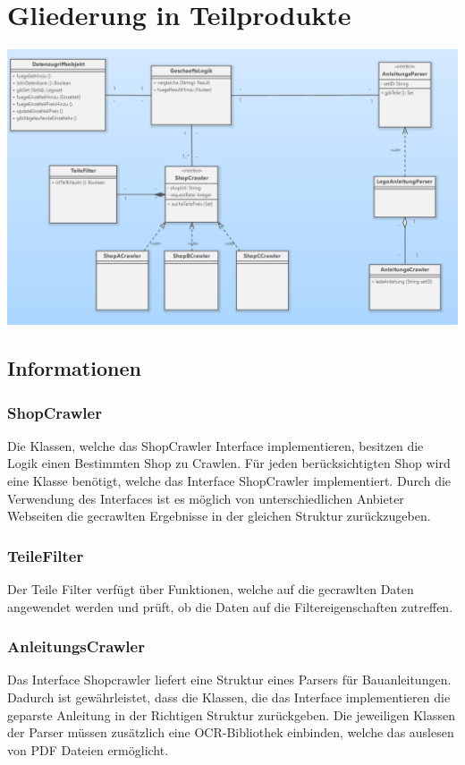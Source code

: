 \section{Gliederung in Teilprodukte}

\includegraphics[width=18cm]{pictures/9.GliederungDerTeilprodukte.png}
\subsection{Informationen}
\subsubsection{ShopCrawler}
Die Klassen, welche das ShopCrawler Interface implementieren, besitzen die Logik einen Bestimmten Shop zu Crawlen. Für jeden berücksichtigten Shop wird eine Klasse benötigt, welche das Interface ShopCrawler implementiert.  Durch die Verwendung des Interfaces ist es möglich von unterschiedlichen Anbieter Webseiten die gecrawlten Ergebnisse in der gleichen Struktur zurückzugeben.

\subsubsection{TeileFilter}
Der Teile Filter verfügt über Funktionen, welche auf die gecrawlten Daten angewendet werden und prüft, ob die Daten auf die Filtereigenschaften zutreffen.

\subsubsection{AnleitungsCrawler}
Das Interface Shopcrawler liefert eine Struktur eines Parsers für Bauanleitungen. Dadurch ist gewährleistet, dass die Klassen, die das Interface implementieren die geparste Anleitung in der Richtigen Struktur zurückgeben. Die jeweiligen Klassen der Parser müssen zusätzlich eine OCR-Bibliothek einbinden, welche das auslesen von PDF Dateien ermöglicht. 
\newline 

